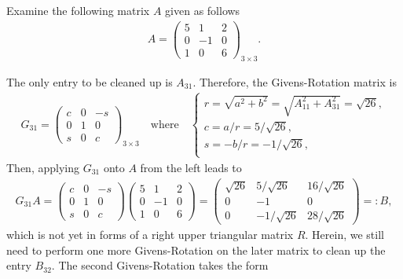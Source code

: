 \documentclass[12pt]{article}
\begin{document}
\clearpage
\begin{exampleboxed}
	Examine the following matrix $A$ given as follows
	\begin{align}
		A = \begin{pmatrix} 5 &1 &2 \\ 0 &-1 &0 \\ 1 &0 &6 \end{pmatrix}_{3\times 3}.
	\end{align}
\end{exampleboxed}
The only entry to be cleaned up is $A_{31}$. Therefore, the Givens-Rotation matrix is 
\begin{align}
	G_{31} = \begin{pmatrix}  c &0 &-s \\ 0 &1 &0 \\ s &0 &c \end{pmatrix}_{3\times 3}
	\quad
	\text{where}
	\quad
	\begin{cases}
		r = \sqrt{a^2+b^2} = \sqrt{A_{11}^2 + A_{31}^2} = \sqrt{26}, \\
		c =  a/r = 5/\sqrt{26},                                      \\
		s = -b/r = -1/\sqrt{26},                                     \\
	\end{cases}
\end{align}
Then, applying $G_{31}$ onto $A$ from the left leads to 
\begin{align}
	G_{31}A = 
	\begin{pmatrix}  c &0 &-s \\ 0 &1 &0 \\ s &0 &c \end{pmatrix}
	\begin{pmatrix} 5 &1 &2 \\ 0 &-1 &0 \\ 1 &0 &6 \end{pmatrix}
	= \begin{pmatrix} \sqrt{26} &5/\sqrt{26} &16/\sqrt{26} \\ 0 &-1 &0 \\ 0 &-1/\sqrt{26} &28/\sqrt{26} \end{pmatrix}=:B,
\end{align}
which is not yet in forms of a right upper triangular matrix $R$.
Herein, we still need to perform one more Givens-Rotation
on the later matrix to clean up the entry $B_{32}$. 
The second Givens-Rotation takes the form
\end{document}
